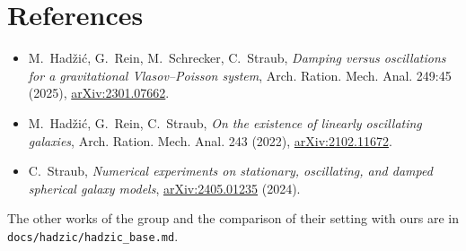 \documentclass[11pt,a4paper]{article}
\begin{document}
\section*{References}

\begin{itemize}
\item[{[HRSS]}] M.~Hadžić, G.~Rein, M.~Schrecker, C.~Straub, \emph{Damping versus oscillations
for a gravitational Vlasov--Poisson system}, Arch. Ration. Mech. Anal. 249:45 (2025),
\href{https://arxiv.org/abs/2301.07662}{arXiv:2301.07662}.
\item[{[HRS]}] M.~Hadžić, G.~Rein, C.~Straub, \emph{On the existence of linearly oscillating
galaxies}, Arch. Ration. Mech. Anal. 243 (2022), \href{https://arxiv.org/abs/2102.11672}{arXiv:2102.11672}.
\item[{[S]}] C.~Straub, \emph{Numerical experiments on stationary, oscillating, and damped spherical
galaxy models}, \href{https://arxiv.org/abs/2405.01235}{arXiv:2405.01235} (2024).
\end{itemize}
The other works of the group and the comparison of their setting with ours are in
\texttt{docs/hadzic/hadzic\_base.md}.
\end{document}
